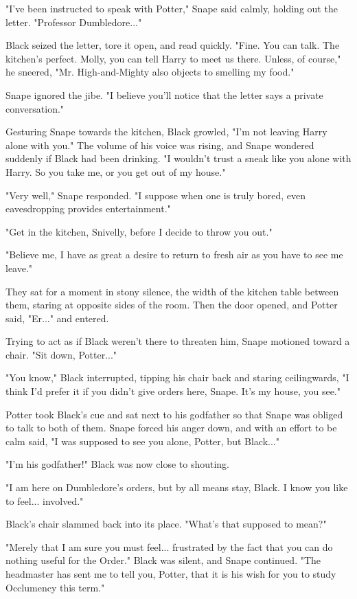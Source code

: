 \documentclass[a4paper,11pt]{article}
\begin{document}
"I've been instructed to speak with Potter," Snape said calmly, holding out the letter. "Professor Dumbledore..."

Black seized the letter, tore it open, and read quickly. "Fine. You can talk. The kitchen's perfect. Molly, you can tell Harry to meet us there. Unless, of course," he sneered, "Mr. High-and-Mighty also objects to smelling my food."

Snape ignored the jibe. "I believe you'll notice that the letter says a private conversation."

Gesturing Snape towards the kitchen, Black growled, "I'm not leaving Harry alone with you." The volume of his voice was rising, and Snape wondered suddenly if Black had been drinking. "I wouldn't trust a sneak like you alone with Harry. So you take me, or you get out of my house."

"Very well," Snape responded. "I suppose when one is truly bored, even eavesdropping provides entertainment."

"Get in the kitchen, Snivelly, before I decide to throw you out."

"Believe me, I have as great a desire to return to fresh air as you have to see me leave."

They sat for a moment in stony silence, the width of the kitchen table between them, staring at opposite sides of the room. Then the door opened, and Potter said, "Er..." and entered.

Trying to act as if Black weren't there to threaten him, Snape motioned toward a chair. "Sit down, Potter..."

"You know," Black interrupted, tipping his chair back and staring ceilingwards, "I think I'd prefer it if you didn't give orders here, Snape. It's my house, you see."

Potter took Black's cue and sat next to his godfather so that Snape was obliged to talk to both of them. Snape forced his anger down, and with an effort to be calm said, "I was supposed to see you alone, Potter, but Black..."

"I'm his godfather!" Black was now close to shouting.

"I am here on Dumbledore's orders, but by all means stay, Black. I know you like to feel... involved."

Black's chair slammed back into its place. "What's that supposed to mean?"

"Merely that I am sure you must feel... frustrated by the fact that you can do nothing useful for the Order." Black was silent, and Snape continued. "The headmaster has sent me to tell you, Potter, that it is his wish for you to study Occlumency this term."
\end{document}
